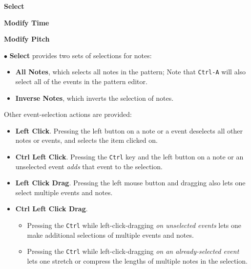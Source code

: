    \begin{enumber}
      \item \textbf{Select}
      \item \textbf{Modify Time}
      \item \textbf{Modify Pitch}
   \end{enumber}

   $\bullet$ \textbf{Select} provides two sets of selections for notes:
   \begin{itemize}
      \item \textbf{All Notes}, which selects all notes in the pattern;
         Note that  \texttt{Ctrl-A} will also select
         all of the events in the pattern editor.
      \item \textbf{Inverse Notes}, which inverts the selection of notes.
   \end{itemize}

   Other event-selection actions are provided:

   \begin{itemize}
      \item {}
         \textbf{Left Click}.
         Pressing the left button on a note or a event deselects all other
         notes or events, and selects the item clicked on.
      \item {}
         \textbf{Ctrl Left Click}.
         Pressing the \texttt{Ctrl} key and the left button on a note or an
         unselected event \textsl{adds} that event to the selection.
      \item {}
         \textbf{Left Click Drag}.
         Pressing the left mouse button and dragging also lets one
         select multiple events and notes.
      \item {}
         \textbf{Ctrl Left Click Drag}.
         \begin{itemize}
            \item Pressing the \texttt{Ctrl} while left-click-dragging
               \textsl{on unselected events} lets one make additional
               selections of multiple events and notes.
            \item Pressing the \texttt{Ctrl} while left-click-dragging
               \textsl{on an already-selected event} lets one stretch or
               compress the lengths of multiple notes in the selection.
         \end{itemize}
   \end{itemize}

